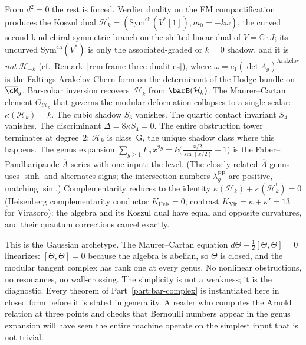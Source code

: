 From $d^2 = 0$ the rest is forced. Verdier duality on the FM
compactification produces the Koszul dual
$\mathcal{H}_k^! =
(\mathrm{Sym}^{\mathrm{ch}}(V^*[1]),m_0=-k\omega)$,
the curved second-kind chiral symmetric branch on the shifted
linear dual of $V = \mathbb{C}\cdot J$; its uncurved
$\mathrm{Sym}^{\mathrm{ch}}(V^*)$ is only the associated-graded
or $k=0$ shadow, and it is \emph{not} $\mathcal{H}_{-k}$
(cf.~Remark~\ref{rem:frame-three-dualities}), where
$\omega = c_1(\det \Lambda_g)^{\mathrm{Arakelov}}$ is the
Faltings-Arakelov Chern form on the determinant of the Hodge
bundle on $\overline{\cM}_g$.
Bar-cobar inversion recovers~$\mathcal{H}_k$ from
$\barB(\mathcal{H}_k)$. The Maurer--Cartan element
$\Theta_{\mathcal{H}_k}$ that governs the modular deformation
collapses to a single scalar:
$\kappa(\mathcal{H}_k) = k$.
The cubic shadow $S_3$ vanishes. The quartic contact invariant
$S_4$ vanishes. The discriminant $\Delta = 8\kappa S_4 = 0$.
The entire obstruction tower terminates at degree~$2$: $\mathcal{H}_k$
is class~G, the unique shadow class where this happens.
The genus expansion
$\sum_{g \geq 1} F_g\, x^{2g}
= k\bigl(\tfrac{x/2}{\sin(x/2)} - 1\bigr)$
is the Faber--Pandharipande $\hat{A}$-series with one input:
the level. (The closely related $\hat{A}$-genus uses
$\sinh$ and alternates signs; the intersection numbers
$\lambda_g^{\mathrm{FP}}$ are positive, matching $\sin$.)
Complementarity reduces to the identity
$\kappa(\mathcal{H}_k) + \kappa(\mathcal{H}_k^!) = 0$
(Heisenberg complementarity conductor $K_{\mathrm{Heis}} = 0$;
contrast $K_{\mathrm{Vir}} = \kappa + \kappa' = 13$ for Virasoro):
the algebra and its Koszul dual have equal and opposite curvatures,
and their quantum corrections cancel exactly.

This is the Gaussian archetype. The Maurer--Cartan equation
$d\Theta + \tfrac{1}{2}[\Theta,\Theta] = 0$
linearizes: $[\Theta,\Theta] = 0$ because the algebra is abelian,
so $\Theta$ is closed, and the modular tangent complex
has rank one at every genus. No nonlinear obstructions, no
resonances, no wall-crossing. The simplicity is not a weakness;
it is the diagnostic. Every theorem of
Part~\ref{part:bar-complex} is instantiated here in closed form
before it is stated in generality. A reader who computes the
Arnold relation at three points and checks that Bernoulli numbers
appear in the genus expansion will have seen the entire machine
operate on the simplest input that is not trivial.


